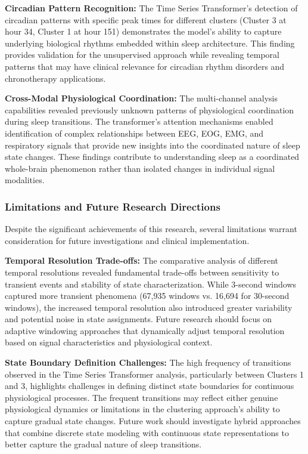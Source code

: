 \documentclass[a4paper,12pt,twoside]{article}
\begin{document}
\textbf{Circadian Pattern Recognition:}
The Time Series Transformer's detection of circadian patterns with specific peak times for different clusters (Cluster 3 at hour 34, Cluster 1 at hour 151) demonstrates the model's ability to capture underlying biological rhythms embedded within sleep architecture. This finding provides validation for the unsupervised approach while revealing temporal patterns that may have clinical relevance for circadian rhythm disorders and chronotherapy applications.

\textbf{Cross-Modal Physiological Coordination:}
The multi-channel analysis capabilities revealed previously unknown patterns of physiological coordination during sleep transitions. The transformer's attention mechanisms enabled identification of complex relationships between EEG, EOG, EMG, and respiratory signals that provide new insights into the coordinated nature of sleep state changes. These findings contribute to understanding sleep as a coordinated whole-brain phenomenon rather than isolated changes in individual signal modalities.

\subsubsection{Limitations and Future Research Directions}

Despite the significant achievements of this research, several limitations warrant consideration for future investigations and clinical implementation.

\textbf{Temporal Resolution Trade-offs:}
The comparative analysis of different temporal resolutions revealed fundamental trade-offs between sensitivity to transient events and stability of state characterization. While 3-second windows captured more transient phenomena (67,935 windows vs. 16,694 for 30-second windows), the increased temporal resolution also introduced greater variability and potential noise in state assignments. Future research should focus on adaptive windowing approaches that dynamically adjust temporal resolution based on signal characteristics and physiological context.

\textbf{State Boundary Definition Challenges:}
The high frequency of transitions observed in the Time Series Transformer analysis, particularly between Clusters 1 and 3, highlights challenges in defining distinct state boundaries for continuous physiological processes. The frequent transitions may reflect either genuine physiological dynamics or limitations in the clustering approach's ability to capture gradual state changes. Future work should investigate hybrid approaches that combine discrete state modeling with continuous state representations to better capture the gradual nature of sleep transitions.
\end{document}
